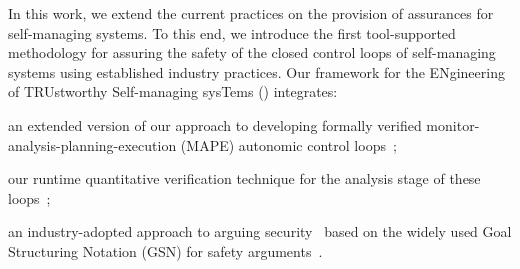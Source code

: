 In this work, we extend the current practices on the provision of assurances for self-managing systems. To this end, we introduce the first tool-supported methodology for assuring the safety of the closed control loops of self-managing systems using established industry practices. Our framework for the ENgineering of TRUstworthy Self-managing sysTems (\approach) integrates:
\squishlist
	\item an extended version of our approach to developing formally verified monitor-analysis-planning-execution (MAPE) autonomic control loops~\cite{Iftikhar2014:SEAMS};
	\item our runtime quantitative verification technique for the analysis stage of these loops~\cite{Calinescu2012:CACM};
	\item an industry-adopted approach to arguing security~\cite{Weinstock2007} based on the widely used Goal Structuring Notation (GSN) for safety arguments~\cite{Kelly2004:DSN}.
\squishend
